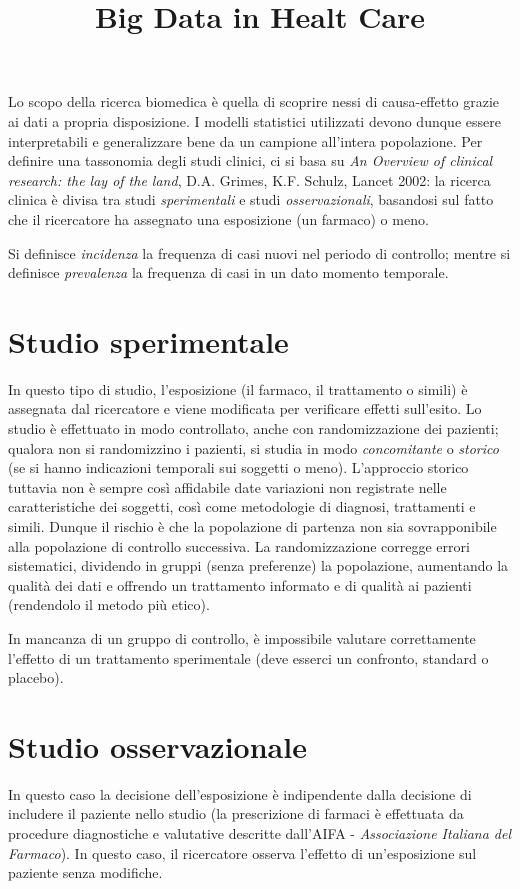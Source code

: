 \documentclass[a4page, twocolumn]{article}
\title{\textbf{Big Data in Healt Care}}
\date{}
\begin{document}
\maketitle
\tableofcontents
\newpage

Lo scopo della ricerca biomedica è quella di scoprire nessi di causa-effetto grazie ai dati a propria disposizione.
I modelli statistici utilizzati devono dunque essere interpretabili e generalizzare bene da un campione all'intera popolazione.
Per definire una tassonomia degli studi clinici, ci si basa su \textit{An Overview of clinical research: the lay of the land}, D.A. Grimes, K.F. Schulz, Lancet 2002: la ricerca clinica è divisa tra studi \textit{sperimentali} e studi \textit{osservazionali}, basandosi sul fatto che il ricercatore ha assegnato una esposizione (un farmaco) o meno.

Si definisce \textit{incidenza} la frequenza di casi nuovi nel periodo di controllo; mentre si definisce \textit{prevalenza} la frequenza di casi in un dato momento temporale.

\section{Studio sperimentale}
In questo tipo di studio, l'esposizione (il farmaco, il trattamento o simili) è assegnata dal ricercatore e viene modificata per verificare effetti sull'esito.
Lo studio è effettuato in modo controllato, anche con randomizzazione dei pazienti; qualora non si randomizzino i pazienti, si studia in modo \textit{concomitante} o \textit{storico} (se si hanno indicazioni temporali sui soggetti o meno).
L'approccio storico tuttavia non è sempre così affidabile date variazioni non registrate nelle caratteristiche dei soggetti, così come metodologie di diagnosi, trattamenti e simili.
Dunque il rischio è che la popolazione di partenza non sia sovrapponibile alla popolazione di controllo successiva.
La randomizzazione corregge errori sistematici, dividendo in gruppi (senza preferenze) la popolazione, aumentando la qualità dei dati e offrendo un trattamento informato e di qualità ai pazienti (rendendolo il metodo più etico).

In mancanza di un gruppo di controllo, è impossibile valutare correttamente l'effetto di un trattamento sperimentale (deve esserci un confronto, standard o placebo).

\section{Studio osservazionale}
In questo caso la decisione dell'esposizione è indipendente dalla decisione di includere il paziente nello studio (la prescrizione di farmaci è effettuata da procedure diagnostiche e valutative descritte dall'AIFA - \textit{Associazione Italiana del Farmaco}).
In questo caso, il ricercatore osserva l'effetto di un'esposizione sul paziente senza modifiche.
\end{document}
